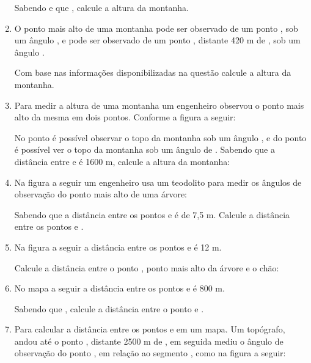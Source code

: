 \documentclass[twocolumn,oneside,a4paper,12pt]{article}
\begin{document}
\begin{enumerate}
Sabendo  e que , calcule a altura da montanha.

\item O ponto mais alto  de uma montanha pode ser observado de um ponto , sob um ângulo , e pode ser observado de um ponto , distante 420 m de , sob um ângulo . 


Com base nas informações disponibilizadas na questão calcule a altura da montanha.

\item Para medir a altura de uma montanha um engenheiro observou o ponto mais alto da mesma em dois pontos. Conforme a figura a seguir:

\newpage
{}

No ponto  é possível observar o topo da montanha sob um ângulo , e do ponto  é possível ver o topo da montanha sob um ângulo de . Sabendo que a distância entre  e  é 1600 m, calcule a altura da montanha:

\item Na figura a seguir um engenheiro usa um teodolito para medir os ângulos de observação do ponto mais alto de uma árvore:


Sabendo que a distância entre os pontos  e  é de 7,5 m. Calcule a distância entre os pontos  e .

\item Na figura a seguir a distância entre os pontos  e  é 12 m.


Calcule a distância entre o ponto , ponto mais alto da árvore e o chão:

\item No mapa a seguir a distância entre os pontos  e  é 800 m.


Sabendo que , calcule a distância entre o ponto  e .

\item Para calcular a distância entre os pontos  e  em um mapa. Um topógrafo, andou até o ponto , distante 2500 m de , em seguida mediu o ângulo de observação do ponto , em relação ao segmento , como na figura a seguir:


\end{enumerate}
\end{document}
